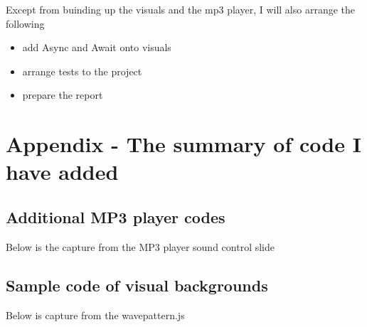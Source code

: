 Except from buinding up the visuals and the mp3 player, I will also arrange the following

\begin{itemize}
  \item add Async and Await onto visuals
  \item arrange tests to the project
  \item prepare the report
\end{itemize}

\section*{ Appendix - The summary of code I have added}

\subsection*{Additional MP3 player codes}

Below is the capture from the MP3 player sound control slide



\subsection*{Sample code of visual backgrounds}

Below is capture from the wavepattern.js



